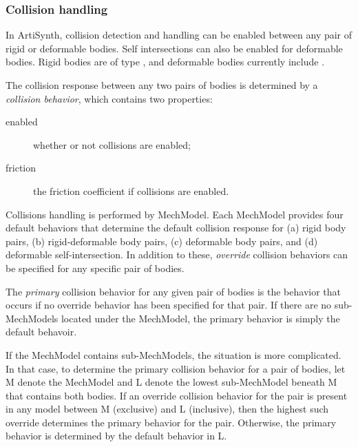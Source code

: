 \documentclass{article}
\begin{document}
\subsubsection{Collision handling}

In ArtiSynth, collision detection and handling can be enabled between
any pair of rigid or deformable bodies. Self intersections can also be
enabled for deformable bodies. Rigid bodies are of type
, and deformable bodies
currently include .

The collision response between any two pairs of bodies is determined
by a {\it collision behavior}, which contains two properties:


\begin{description}

\item[enabled]\mbox{}

whether or not collisions are enabled;

\item[friction]\mbox{}

the friction coefficient if collisions are enabled.	

\end{description}

Collisions handling is performed by MechModel.  Each MechModel
provides four default behaviors that determine the default collision
response for (a) rigid body pairs, (b) rigid-deformable body pairs,
(c) deformable body pairs, and (d) deformable self-intersection. In
addition to these, {\it override} collision behaviors can be specified for
any specific pair of bodies.

The {\it primary} collision behavior for any given pair of bodies is the
behavior that occurs if no override behavior has been specified for
that pair. If there are no sub-MechModels located under the MechModel,
the primary behavior is simply the default behavoir.

If the MechModel contains sub-MechModels, the situation is more
complicated. In that case, to determine the primary collision behavior
for a pair of bodies, let M denote the MechModel and L denote the
lowest sub-MechModel beneath M that contains both bodies.  If an
override collision behavior for the pair is present in any model
between M (exclusive) and L (inclusive), then the highest such
override determines the primary behavior for the pair. Otherwise, the
primary behavior is determined by the default behavior in L.
\end{document}
